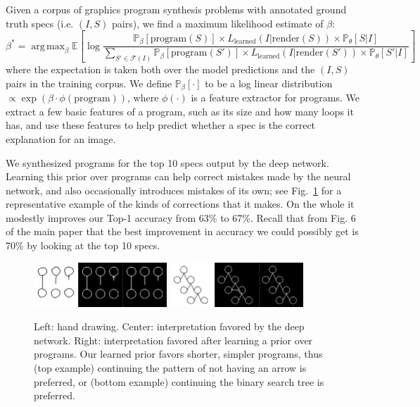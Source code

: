 \documentclass{article}
\DeclareMathOperator*{\argmax}{arg\,max} %
\newcommand{\expect}{\mathds{E}} %
\newcommand{\probability}{\mathds{P}} %
\begin{document}
Given a corpus of graphics program synthesis problems with annotated ground truth specs (i.e. $(I,S)$ pairs),
we find a maximum likelihood estimate of $\beta$:
\begin{equation}
  \beta^* = \argmax_{\beta} \expect \left[ \log \frac{\probability_{\beta} [\text{program}(S)]\times L_{\text{learned}}(I|\text{render}(S))\times \probability_\theta[S|I]}{\sum_{S'\in \mathcal{F}(I)} \probability_{\beta} [\text{program}(S')]\times L_{\text{learned}}(I|\text{render}(S'))\times \probability_\theta[S'|I]} \right]
\end{equation}
where the expectation is taken both over the model predictions and the
$(I,S)$ pairs in the training corpus.  We define $\probability_{\beta}
[\cdot]$ to be a log linear distribution $\propto \exp
(\beta\cdot \phi(\text{program}))$, where $\phi(\cdot)$ is a feature
extractor for programs.  We extract a few basic features of a
program, such as its size and how many loops it has, and use these
features to help predict whether a spec is the correct explanation
for an image.

We synthesized programs for the top 10 specs
output by the deep network.  Learning this prior over programs can
help correct mistakes made by the neural network, and also
occasionally introduces mistakes of its own; see
Fig.~\ref{exampleOfProgramCorrectingMistake} for a representative
example of the kinds of corrections that it makes. On the whole
it modestly improves our Top-1 accuracy from 63\% to 67\%.  Recall that
from Fig. 6 of the main paper that the best improvement
in accuracy we could possibly get is 70\% by looking at the top 10 specs. 
\begin{figure}[h]\centering
  \begin{minipage}{6cm}
      \includegraphics[width = 5cm]{figures/programSuccess7.png}
  \includegraphics[width = 5cm]{figures/programSuccess16.png}
    \end{minipage}
  \caption{Left: hand drawing. Center: interpretation favored by the deep network. Right: interpretation favored after learning a prior over programs. Our learned prior favors shorter, simpler programs, thus (top example) continuing the pattern of not having an arrow is preferred, or (bottom example) continuing the binary search tree is preferred.}\label{exampleOfProgramCorrectingMistake}
\end{figure}
\pagebreak
\end{document}
